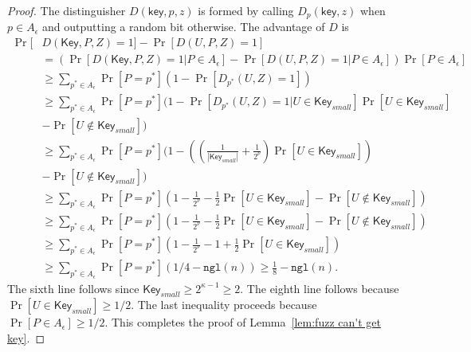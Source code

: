 \documentclass[11pt]{article}
\newcommand{\lemref}[1]{\mbox{Lemma~\ref{#1}}}
\newcommand{\class}[1]{{\ensuremath{\mathsf{#1}}}}
\newcommand{\key}{\ensuremath{\class{key}}\xspace}
\newcommand{\Key}{\ensuremath{\class{Key}}\xspace}
\newcommand{\ngl}{\ensuremath{\mathtt{ngl}}\xspace}
\begin{document}
\begin{proof}
The distinguisher $D(\key, p, z)$ is formed by calling $D_p(\key, z)$ when $p\in A_{\epsilon}$ and outputting a random bit otherwise.  The advantage of $D$ is 
\begin{align*}
\Pr[&D(\Key, P, Z) = 1] - \Pr[D(U, P, Z) =1]\\
&=(\Pr[D(\Key, P, Z) = 1| P\in A_{\epsilon}] - \Pr[D(U, P, Z) =1 | P\in A_{\epsilon}])\Pr[P\in A_{\epsilon}]\\
&\ge \sum_{p^*\in A_{\epsilon}} \Pr[P=p^*] \left(1 - \Pr[D_{p^*}(U, Z)=1]\right)\\
&\ge \sum_{p^*\in A_{\epsilon}} \Pr[P=p^*] (1- \Pr[D_{p^*}(U, Z)=1 | U\in \Key_{small}]\Pr[U\in \Key_{small}] \\&- \Pr[U\not\in \Key_{small}])\\
&\ge \sum_{p^*\in A_{\epsilon}} \Pr[P=p^*] (1- \left(\left(\frac{1}{|\Key_{small}|}+\frac{1}{2^\nu}\right)\Pr[U\in \Key_{small}]\right) \\&- \Pr[U\not\in \Key_{small}])\\
&\ge \sum_{p^*\in A_{\epsilon}} \Pr[P=p^*] \left(1- \frac{1}{2^{\nu}} -\frac{1}{2}\Pr[U\in \Key_{small}] - \Pr[U\not \in \Key_{small}]\right)\\
&\ge \sum_{p^*\in A_{\epsilon}} \Pr[P=p^*] \left(1- \frac{1}{2^{\nu}} -\frac{1}{2}\Pr[U\in \Key_{small}] - \Pr[U\not \in \Key_{small}]\right)\\
&\ge \sum_{p^*\in A_{\epsilon}} \Pr[P=p^*] \left(1- \frac{1}{2^{\nu}} -1+\frac{1}{2}\Pr[U\in \Key_{small}] \right)\\
&\ge \sum_{p^* \in A_{\epsilon}} \Pr[P=p^*]\left(1/4-\ngl(n)\right) \ge \frac{1}{8}-\ngl(n).
\end{align*}
The sixth line follows since $\Key_{small} \ge 2^{\kappa-1}\ge 2$.  The eighth line follows because $\Pr[U\in \Key_{small}]\ge 1/2$.  The last inequality proceeds because $\Pr[P\in A_{\epsilon}]\ge 1/2$.
This completes the proof of \lemref{lem:fuzz can't get key}.
\end{proof}
\end{document}
